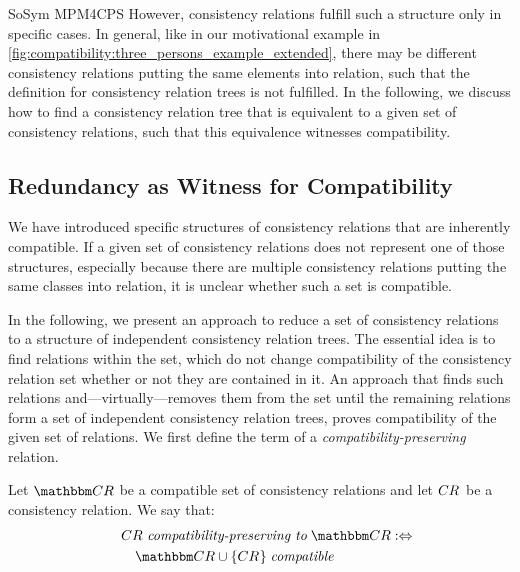 \begin{copiedFrom}{SoSym MPM4CPS}
However, consistency relations fulfill such a structure only in specific cases.
In general, like in our motivational example in \autoref{fig:compatibility:three_persons_example_extended}, there may be different consistency relations putting the same elements into relation, such that the definition for consistency relation trees is not fulfilled.
In the following, we discuss how to find a consistency relation tree that is equivalent to a given set of consistency relations, such that this equivalence witnesses compatibility.


\subsection{Redundancy as Witness for Compatibility}
\label{sec:formalapproach:redundancy}


We have introduced specific structures of consistency relations that are inherently compatible.
If a given set of consistency relations does not represent one of those structures, especially because there are multiple consistency relations putting the same classes into relation, it is unclear whether such a set is compatible.

In the following, we present an approach to reduce a set of consistency relations to a structure of independent consistency relation trees.
The essential idea is to find relations within the set, which do not change compatibility of the consistency relation set whether or not they are contained in it.
An approach that finds such relations and---virtually---removes them from the set until the remaining relations form a set of independent consistency relation trees, proves compatibility of the given set of relations.
We first define the term of a \emph{compatibility-preserving} relation.

\begin{definition}
    \label{def:compatibilitypreserving}
    Let $\consistencyrelationset{CR}$ be a compatible set of consistency relations and let $CR_{}$ be a consistency relation. We say that:
    \begin{align*}
        \formulaskip &
        \consistencyrelation{CR}{} \compatibilitypreservingtomath \consistencyrelationset{CR} \equivalentperdefinition \\
        & \formulaskip
        \consistencyrelationset{CR} \cup \setted{\consistencyrelation{CR}{}} \compatiblemath
    \end{align*}
\end{definition}


\end{copiedFrom}
